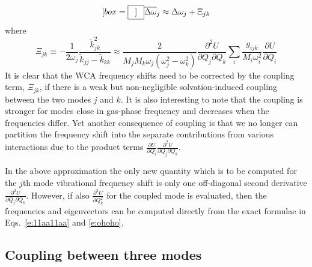 \documentclass[a4paper,titlepage,twoside,fleqn,12pt]{book}
\newcommand*{\widebox}[2][0.5em]{\fbox{\hspace{#1}$\displaystyle #2$\hspace{#1}}}
\newcommand{\fderiv}[2]{\ensuremath{
    \frac{\partial #1}{\partial #2}}}
\newcommand{\sderiv}[2]{\ensuremath{
    \frac{\partial^2 #1}{\partial #2^2}
    }}
\newcommand{\sderivd}[3]{\ensuremath{
    \frac{\partial^2 #1}{\partial #2 \partial #3}
    }}
\begin{document}
\begin{refsection}
\begin{equation}[box=\widebox]
   \overline{\Delta\omega}_j \approx \Delta\omega_j + \Xi_{jk}
\end{equation}
%
where
%
\begin{equation}
 \Xi_{jk} \equiv -\frac{1}{2\omega_j} \frac{\tilde{k}_{jk}^2}{\tilde{k}_{jj} - \tilde{k}_{kk}}
 \approx \frac{2}{M_jM_k\omega_j\left(\omega_j^2 - \omega_k^2\right)} \sderivd{U}{Q_j}{Q_k}
 \sum_i \frac{g_{ijk}}{M_i\omega_i^2}  \fderiv{U}{Q_i}  
\end{equation}
%
It is clear that the WCA frequency shifts need to be corrected
by the coupling term, $\Xi_{jk}$, if there 
is a weak but non\hyp{}negligible solvation\hyp{}induced coupling 
between the two modes $j$ and $k$. It is also interesting
to note that the coupling is stronger for modes close in gas\hyp{}phase
frequency
and decreases when the frequencies differ. 
Yet another consequence of coupling is that 
we no longer can partition the frequency shift into the
separate contributions from various interactions due to the
product terms $\fderiv{U}{Q_i}\sderivd{U}{Q_j}{Q_k}$.

In the above approximation the only new quantity which is to
be computed for the $j$th mode vibrational frequency shift 
is only one off\hyp{}diagonal second derivative $\sderivd{U}{Q_j}{Q_k}$.
However, if also $\sderiv{U}{Q_k}$ for the coupled mode
is evaluated, then the frequencies and eigenvectors can be computed
directly from the exact formulae in Eqs.~\eqref{e:11aa11aa}
and \eqref{e:ohoho}.



\subsection{Coupling between three modes\label{s:coupling-between-3-modes}}


\end{refsection}
\end{document}
